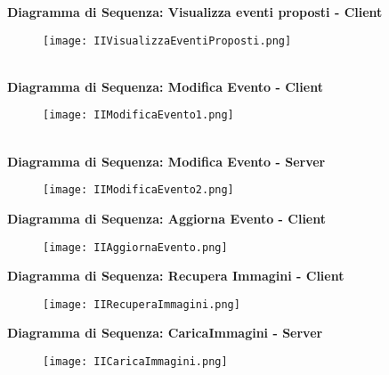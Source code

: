 \textbf{Diagramma di Sequenza: Visualizza eventi proposti - Client}\\
\begin{figure}[h!]
    \begin{center}
        \texttt{[image: IIVisualizzaEventiProposti.png]}
    \end{center}
\end{figure}\\
\clearpage
\textbf{Diagramma di Sequenza: Modifica Evento - Client}\\
\begin{figure}[h!]
    \begin{center}
        \texttt{[image: IIModificaEvento1.png]}
    \end{center}
\end{figure}\\

\textbf{Diagramma di Sequenza: Modifica Evento - Server}\\

\begin{figure}[h!]
    \begin{center}
        \texttt{[image: IIModificaEvento2.png]}
    \end{center}
\end{figure}
\clearpage
\textbf{Diagramma di Sequenza: Aggiorna Evento - Client}\\
\begin{figure}[h!]
    \begin{center}
        \texttt{[image: IIAggiornaEvento.png]}
    \end{center}
\end{figure}

\textbf{Diagramma di Sequenza: Recupera Immagini - Client}\\
\begin{figure}[h!]
    \begin{center}
        \texttt{[image: IIRecuperaImmagini.png]}
    \end{center}
\end{figure}
\clearpage                                                                      
\textbf{Diagramma di Sequenza: CaricaImmagini - Server}\\
\begin{figure}[h!]
    \begin{center}
        \texttt{[image: IICaricaImmagini.png]}
    \end{center}
\end{figure}
\clearpage

